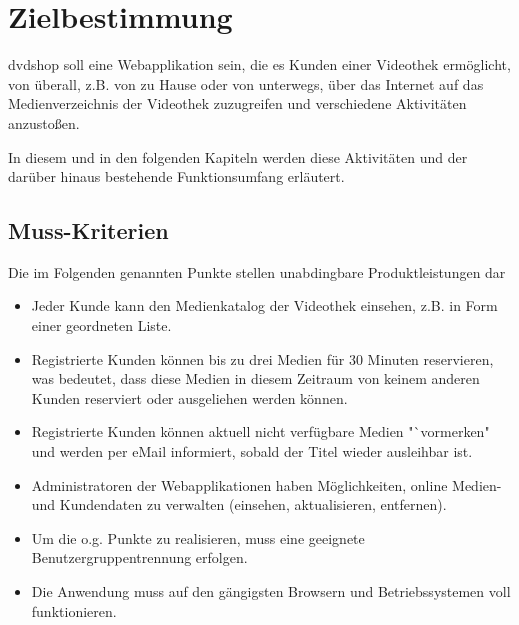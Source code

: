 \documentclass[12pt,oneside,a4paper,bibtotoc,liststotoc,pointlessnumbers]{scrartcl}
\begin{document}
\newpage

\setcounter{page}{1}


\section{Zielbestimmung}
dvdshop soll eine Webapplikation sein, die es Kunden einer Videothek ermöglicht, von überall, z.B. von zu Hause oder von unterwegs, über das Internet auf das Medienverzeichnis der Videothek zuzugreifen und verschiedene Aktivitäten anzustoßen.\par
In diesem und in den folgenden Kapiteln werden diese Aktivitäten und der  darüber hinaus bestehende Funktionsumfang erläutert.
\subsection{Muss-Kriterien}
Die im Folgenden genannten Punkte stellen unabdingbare Produktleistungen dar
\begin{itemize}
\item Jeder Kunde kann den Medienkatalog der Videothek einsehen, z.B. in Form einer geordneten Liste.
\item Registrierte Kunden können bis zu drei Medien für 30 Minuten reservieren, was bedeutet, dass diese Medien in diesem Zeitraum von keinem anderen Kunden reserviert oder ausgeliehen werden können.
\item Registrierte Kunden können aktuell nicht verfügbare Medien "`vormerken" und werden per eMail informiert, sobald der Titel wieder ausleihbar ist.
\item Administratoren der Webapplikationen haben Möglichkeiten, online Medien- und Kundendaten zu verwalten (einsehen, aktualisieren, entfernen).
\item Um die o.g. Punkte zu realisieren, muss eine geeignete Benutzergruppentrennung erfolgen. 
\item Die Anwendung muss auf den gängigsten Browsern und Betriebssystemen voll funktionieren.
\end{itemize}
\end{document}
